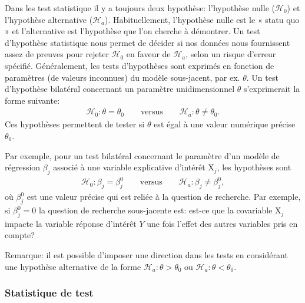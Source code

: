 \documentclass[
  11pt,
  letterpaper,
]{article}
\theoremstyle{definition}
\theoremstyle{definition}
\theoremstyle{definition}
\theoremstyle{definition}
\theoremstyle{remark}
\begin{document}
Dans les test statistique il y a toujours deux hypothèse: l'hypothèse nulle (\(\mathscr{H}_{0}\)) et l'hypothèse alternative (\(\mathscr{H}_a\)). Habituellement, l'hypothèse nulle est le « statu quo » et l'alternative est l'hypothèse que l'on cherche à démontrer. Un test d'hypothèse statistique nous permet de décider si nos données nous fournissent assez de preuves pour rejeter \(\mathscr{H}_0\) en faveur de \(\mathscr{H}_a\), selon un risque d'erreur spécifié. Généralement, les tests d'hypothèses sont exprimés en fonction de paramètres (de valeurs inconnues) du modèle sous-jacent, par ex. \(\theta\). Un test d'hypothèse bilatéral concernant un paramètre unidimensionnel \(\theta\) s'exprimerait la forme suivante:
\begin{align*}
\mathscr{H}_0: \theta=\theta_0 \qquad \text{versus} \qquad \mathscr{H}_a:\theta \neq \theta_0.
\end{align*}
Ces hypothèses permettent de tester si \(\theta\) est égal à une valeur numérique précise \(\theta_0\).

Par exemple, pour un test bilatéral concernant le paramètre d'un modèle de régression \(\beta_j\) associé à une variable explicative d'intérêt \(\mathrm{X}_j\), les hypothèses sont
\begin{align*}
\mathscr{H}_0: \beta_j=\beta_j^0 \qquad \text{versus} \qquad \mathscr{H}_a:\beta_j \neq \beta_j^0,
\end{align*}
où \(\beta_j^0\) est une valeur précise qui est reliée à la question de recherche. Par exemple, si \(\beta_j^0=0\) la question de recherche sous-jacente est: est-ce que la covariable \(\mathrm{X}_j\) impacte la variable réponse d'intérêt \(Y\) une fois l'effet des autres variables pris en compte?

Remarque: il est possible d'imposer une direction dans les tests en considérant une hypothèse alternative de la forme \(\mathscr{H}_a: \theta > \theta_0\) ou \(\mathscr{H}_a: \theta < \theta_0\).

\hypertarget{statistique-de-test}{%
\subsubsection{Statistique de test}\label{statistique-de-test}}
\end{document}
